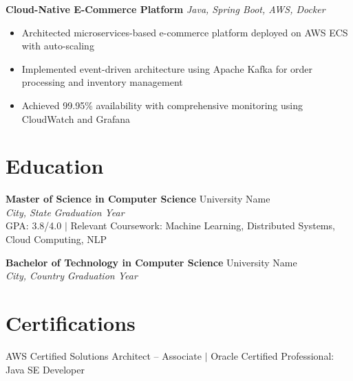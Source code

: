 \documentclass[11pt,a4paper]{article}
\begin{document}
\textbf{Cloud-Native E-Commerce Platform} \hfill \textit{Java, Spring Boot, AWS, Docker}
\begin{itemize}
    \item Architected microservices-based e-commerce platform deployed on AWS ECS with auto-scaling
    \item Implemented event-driven architecture using Apache Kafka for order processing and inventory management
    \item Achieved 99.95\% availability with comprehensive monitoring using CloudWatch and Grafana
\end{itemize}

\section{Education}

\textbf{Master of Science in Computer Science} \hfill University Name\\
\textit{City, State} \hfill \textit{Graduation Year}\\
GPA: 3.8/4.0 $\vert$ Relevant Coursework: Machine Learning, Distributed Systems, Cloud Computing, NLP

\textbf{Bachelor of Technology in Computer Science} \hfill University Name\\
\textit{City, Country} \hfill \textit{Graduation Year}

\section{Certifications}
AWS Certified Solutions Architect -- Associate $\vert$
Oracle Certified Professional: Java SE Developer
\end{document}
